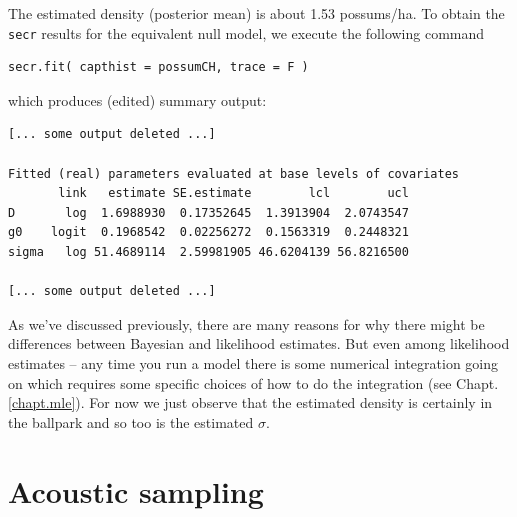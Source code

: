 The estimated density (posterior mean) is about 1.53 possums/ha.
To obtain the \mbox{\tt secr} results for the equivalent null model, we execute the following command
\begin{verbatim}
secr.fit( capthist = possumCH, trace = F )
\end{verbatim}
which produces (edited) summary output:
\begin{verbatim}
[... some output deleted ...]

Fitted (real) parameters evaluated at base levels of covariates
       link   estimate SE.estimate        lcl        ucl
D       log  1.6988930  0.17352645  1.3913904  2.0743547
g0    logit  0.1968542  0.02256272  0.1563319  0.2448321
sigma   log 51.4689114  2.59981905 46.6204139 56.8216500

[... some output deleted ...]
\end{verbatim}
As we've discussed previously, there are many reasons for why there
might be differences between Bayesian and likelihood estimates.  But
even among likelihood estimates -- any time you run a model there is
some numerical integration going on which requires some specific
choices of how to do the integration (see Chapt. \ref{chapt.mle}).
For now we just observe that the estimated density is certainly in the
ballpark and so too is the estimated $\sigma$.



\section{Acoustic sampling}
\label{poisson-mn.sec.acoustic}


